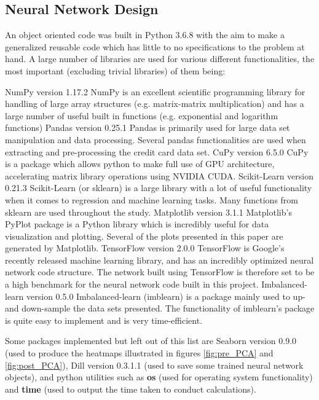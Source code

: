     \subsection{Neural Network Design}
        An object oriented code was built in Python 3.6.8 with the aim to make a generalized reusable code which has little to no specifications to the problem at hand. A large number of libraries are used for various different functionalities, the most important (excluding trivial %
        libraries) of them being:
        \begin{outline}[itemize]
            \1 NumPy version 1.17.2
                \2 NumPy is an excellent scientific programming library for handling of large array structures (e.g. matrix-matrix multiplication) and has a large number of useful built in functions (e.g. exponential and logarithm functions)
            \1 Pandas version 0.25.1
                \2 Pandas is primarily used for large data set manipulation and data processing. Several pandas functionalities are used when extracting and pre-processing the credit card data set.
            \1 CuPy version 6.5.0
            	\2 CuPy is a package which allows python to make full use of GPU architecture, accelerating matrix library operations using NVIDIA CUDA.
            \1 Scikit-Learn version 0.21.3
                \2 Scikit-Learn (or sklearn) is a large library with a lot of useful functionality when it comes to regression and machine learning tasks. Many functions from sklearn are used throughout the study.
            \1 Matplotlib version 3.1.1
                \2 Matplotlib's PyPlot package is a Python library which is incredibly useful for data visualization and plotting. Several of the plots presented in this paper are generated by Matplotlib.
            \1 TensorFlow version 2.0.0
                \2 TensorFlow is Google's recently released machine learning library, and has an incredibly optimized neural network code structure. The network built using TensorFlow is therefore set to be a high benchmark for the neural network code built in this project.
            \1 Imbalanced-learn version 0.5.0
                \2 Imbalanced-learn (imblearn) is a package mainly used to up- and down-sample the data sets presented. The functionality of imblearn's package is quite easy to implement and is very time-efficient.
        \end{outline}
        Some packages implemented but left out of this list are Seaborn version 0.9.0 (used to produce the heatmaps illustrated in figures \ref{fig:pre_PCA} and \ref{fig:post_PCA}),
        Dill version 0.3.1.1 (used to save some trained neural network objects), and python utilities such as \textbf{os} (used for operating system functionality) and \textbf{time} (used to output the time taken to conduct calculations).
        
